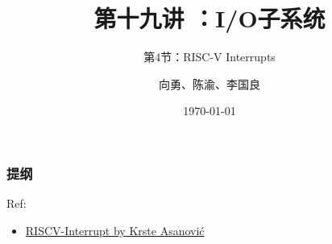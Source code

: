 


\title[第19讲]{第十九讲 ：I/O子系统} %
\subtitle{第4节：RISC-V Interrupts}
\author{向勇、陈渝、李国良} %
\date{\today} %



\begin{frame}
\titlepage %
\end{frame}

\begin{frame}
\frametitle{提纲} %
\tableofcontents %

Ref:
    \begin{itemize}
        \item \href{https://riscv.org/wp-content/uploads/2016/07/Tue0900_RISCV-20160712-InterruptsV2.pdf}{RISCV-Interrupt  by Krste Asanović}
    \end{itemize}

\end{frame}
